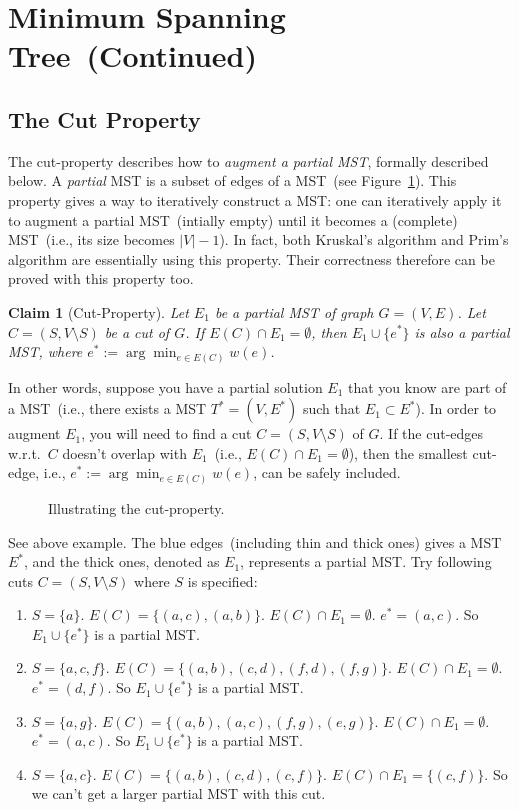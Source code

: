 \documentclass[letterpaper,11pt]{article}
\theoremstyle{mytheorem}
\newtheorem{claim}{Claim}
\begin{document}
\section*{Minimum Spanning Tree~(Continued)}

\subsection*{The Cut Property}

The cut-property describes how to \emph{augment a partial MST}, 
formally described below.
A \emph{partial} MST is a subset of edges of a MST~(see Figure~\ref{fig:spanning}).
This property gives a way to iteratively construct a MST: one can iteratively
apply it to augment a partial MST~(intially empty) until it becomes a (complete) 
MST~(i.e., its size becomes $|V| - 1$).
In fact, both Kruskal's algorithm and Prim's algorithm
are essentially using this property.
Their correctness therefore can be proved with this property too.

\begin{claim}[Cut-Property]
Let $E_1$ be a partial MST of graph $G = (V, E)$. %
Let $C = (S,V\setminus S)$ be a cut of $G$.
If $E(C) \cap E_1 = \emptyset$, %
then $E_1\cup \{e^*\}$ is also a partial MST, where $e^* := \arg\min_{e\in E(C)} w(e)$.
\end{claim}

In other words, suppose you have a partial solution $E_1$ that you know
are part of a MST~(i.e., there exists a MST $T^* = (V, E^*)$ such that $E_1\subset E^*$). 
In order to augment $E_1$, you will need to find a cut $C = (S, V\setminus S)$ of $G$.
If the cut-edges w.r.t.\ $C$ doesn't overlap with $E_1$~(i.e., $E(C)\cap E_1 = \emptyset$),
then the smallest cut-edge, i.e., $e^* := \arg\min_{e\in E(C)} w(e)$,
can be safely included.

\begin{figure}[h]
\centering{}
\caption{Illustrating the cut-property.}
\label{fig:spanning}
\end{figure}

See above example. The blue edges~(including thin and thick ones)
gives a MST $E^*$, and the thick ones, denoted as $E_1$, represents a partial MST.
Try following cuts $C = (S, V\setminus S)$ where $S$ is specified:
\vspace*{-\topsep}
\begin{enumerate}
\item $S = \{a\}$. $E(C) = \{(a,c), (a,b)\}$. $E(C) \cap E_1 = \emptyset$. $e^* = (a,c)$.
So $E_1\cup\{e^*\}$ is a partial MST.
\item $S = \{a,c,f\}$. $E(C) = \{(a,b), (c,d), (f,d), (f,g)\}$. $E(C) \cap E_1 = \emptyset$. $e^* = (d,f)$.
So $E_1\cup\{e^*\}$ is a partial MST.
\item $S = \{a,g\}$. $E(C) = \{(a,b), (a,c), (f,g), (e,g)\}$. $E(C) \cap E_1 = \emptyset$. $e^* = (a,c)$.
So $E_1\cup\{e^*\}$ is a partial MST.
\item $S = \{a,c\}$. $E(C) = \{(a,b), (c,d), (c,f)\}$. $E(C) \cap E_1 = \{(c,f)\}$. So we can't get a larger partial MST with this cut.
\end{enumerate}
\end{document}
